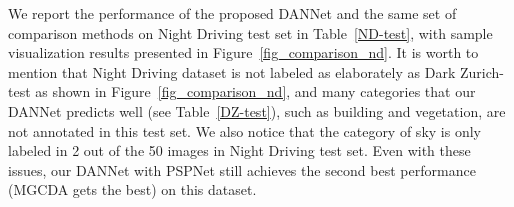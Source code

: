 \documentclass[final]{cvpr}
\begin{document}
\vspace{0.1cm}
\hspace{0.2cm}
We report the performance of the proposed DANNet and the same set of comparison methods on Night Driving test set in Table~\ref{ND-test}, with sample 
visualization results presented in Figure~\ref{fig_comparison_nd}.
It is worth to mention that Night Driving dataset is not labeled as elaborately as Dark Zurich-test as shown in Figure~\ref{fig_comparison_nd},
and  many categories that our DANNet predicts well (see Table~\ref{DZ-test}), such as building and vegetation, are not annotated in this test set. 
We also notice that the category of sky is only labeled in 2 out of the 50 images in Night Driving test set. 
Even with these issues, our DANNet with PSPNet still achieves the second best performance (MGCDA gets the best) on this dataset. 
\end{document}

